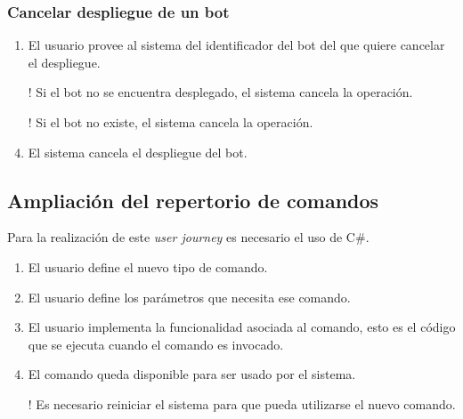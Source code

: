 \subsubsection{Cancelar despliegue de un bot}

\begin{enumerate}
	\item El usuario provee al sistema del identificador del bot del que quiere cancelar el despliegue.
	\item[!] Si el bot no se encuentra desplegado, el sistema cancela la operación.
	\item[!] Si el bot no existe, el sistema cancela la operación.
	\item El sistema cancela el despliegue del bot.
\end{enumerate}


\subsection{Ampliación del repertorio de comandos}

Para la realización de este \textit{user journey} es necesario el uso de C\#.

\begin{enumerate}
	\item El usuario define el nuevo tipo de comando.
	\item El usuario define los parámetros que necesita ese comando.
	\item El usuario implementa la funcionalidad asociada al comando, esto es el código que se ejecuta cuando el comando es invocado.
	\item El comando queda disponible para ser usado por el sistema.
	\item[!] Es necesario reiniciar el sistema para que pueda utilizarse el nuevo comando.
\end{enumerate}